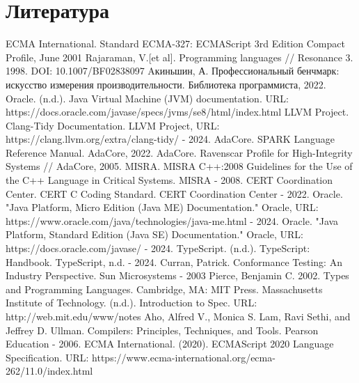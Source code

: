 \documentclass{mipt-thesis-bs}
\begin{document}
\chapter{Литература}
\begin{thebibliography}{99}
    ECMA International. Standard ECMA-327: ECMAScript 3rd Edition Compact Profile, June 2001
    Rajaraman, V.[et al]. Programming languages // Resonance 3. 1998. DOI: 10.1007/BF02838097
    Aкиньшин, А. Профессиональный бенчмарк: искусство измерения производительности. Библиотека программиста, 2022.
    Oracle. (n.d.). Java Virtual Machine (JVM) documentation. URL: https://docs.oracle.com/javase/specs/jvms/se8/html/index.html
    LLVM Project. Clang-Tidy Documentation. LLVM Project, URL: https://clang.llvm.org/extra/clang-tidy/ - 2024.
    AdaCore. SPARK Language Reference Manual. AdaCore, 2022.
    AdaCore. Ravenscar Profile for High-Integrity Systems // AdaCore, 2005.
    MISRA. MISRA C++:2008 Guidelines for the Use of the C++ Language in Critical Systems. MISRA - 2008.
    CERT Coordination Center. CERT C Coding Standard. CERT Coordination Center - 2022.
    Oracle. "Java Platform, Micro Edition (Java ME) Documentation." Oracle, URL: https://www.oracle.com/java/technologies/java-me.html - 2024.
    Oracle. "Java Platform, Standard Edition (Java SE) Documentation." Oracle, URL: https://docs.oracle.com/javase/ - 2024.
    TypeScript. (n.d.). TypeScript: Handbook. TypeScript, n.d. - 2024.
    Curran, Patrick. Conformance Testing: An Industry Perspective. Sun Microsystems - 2003
    Pierce, Benjamin C. 2002. Types and Programming Languages. Cambridge, MA: MIT Press.
    Massachusetts Institute of Technology. (n.d.). Introduction to Spec. URL: http://web.mit.edu/www/notes
    Aho, Alfred V., Monica S. Lam, Ravi Sethi, and Jeffrey D. Ullman. Compilers: Principles, Techniques, and Tools. Pearson Education - 2006.
    ECMA International. (2020). ECMAScript 2020 Language Specification. URL: https://www.ecma-international.org/ecma-262/11.0/index.html
\end{thebibliography}
\end{document}
